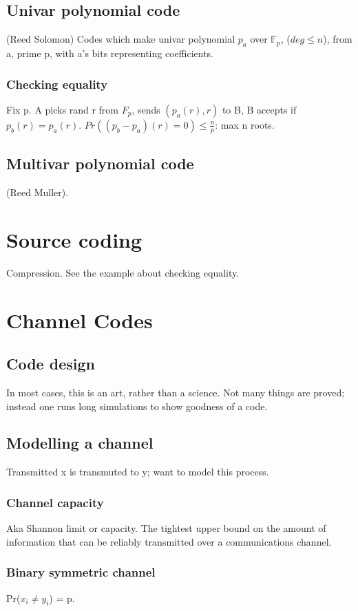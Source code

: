 \documentclass[oneside, article]{memoir}
\begin{document}
\section{Univar polynomial code}
(Reed Solomon) Codes which make univar polynomial $p_{a}$ over $\mathbb{F}_{p}$, ($deg \leq n$), from a, prime p, with a's bits representing coefficients.

\subsection{Checking equality}
Fix p. A picks rand r from $F_{p}$, sends $(p_{a}(r), r)$ to B, B accepts if $p_{b}(r) = p_{a}(r)$. $Pr((p_{b}-p_{a})(r) = 0) \leq \frac{n}{p}$: max n roots.

\section{Multivar polynomial code}
(Reed Muller). \tbc

\chapter{Source coding}
Compression. See the example about checking equality.

\chapter{Channel Codes}
\section{Code design}
In most cases, this is an art, rather than a science. Not many things are proved; instead one runs long simulations to show goodness of a code.

\section{Modelling a channel}
Transmitted x is transmuted to y; want to model this process.

\subsection{Channel capacity}
Aka Shannon limit or capacity. The tightest upper bound on the amount of information that can be reliably transmitted over a communications channel.

\subsection{Binary symmetric channel}
Pr($x_i \neq y_i$) = p.
\end{document}
